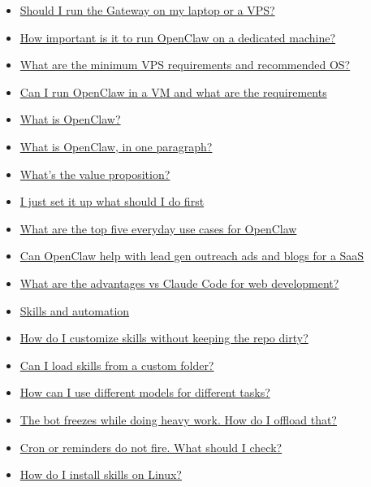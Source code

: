 \begin{itemize}
  \item \href{\#should-i-run-the-gateway-on-my-laptop-or-a-vps}{Should I run the Gateway on my laptop or a VPS?}
  \item \href{\#how-important-is-it-to-run-openclaw-on-a-dedicated-machine}{How important is it to run OpenClaw on a dedicated machine?}
  \item \href{\#what-are-the-minimum-vps-requirements-and-recommended-os}{What are the minimum VPS requirements and recommended OS?}
  \item \href{\#can-i-run-openclaw-in-a-vm-and-what-are-the-requirements}{Can I run OpenClaw in a VM and what are the requirements}
  \item \href{\#what-is-openclaw}{What is OpenClaw?}
  \item \href{\#what-is-openclaw-in-one-paragraph}{What is OpenClaw, in one paragraph?}
  \item \href{\#whats-the-value-proposition}{What's the value proposition?}
  \item \href{\#i-just-set-it-up-what-should-i-do-first}{I just set it up what should I do first}
  \item \href{\#what-are-the-top-five-everyday-use-cases-for-openclaw}{What are the top five everyday use cases for OpenClaw}
  \item \href{\#can-openclaw-help-with-lead-gen-outreach-ads-and-blogs-for-a-saas}{Can OpenClaw help with lead gen outreach ads and blogs for a SaaS}
  \item \href{\#what-are-the-advantages-vs-claude-code-for-web-development}{What are the advantages vs Claude Code for web development?}
  \item \href{\#skills-and-automation}{Skills and automation}
  \item \href{\#how-do-i-customize-skills-without-keeping-the-repo-dirty}{How do I customize skills without keeping the repo dirty?}
  \item \href{\#can-i-load-skills-from-a-custom-folder}{Can I load skills from a custom folder?}
  \item \href{\#how-can-i-use-different-models-for-different-tasks}{How can I use different models for different tasks?}
  \item \href{\#the-bot-freezes-while-doing-heavy-work-how-do-i-offload-that}{The bot freezes while doing heavy work. How do I offload that?}
  \item \href{\#cron-or-reminders-do-not-fire-what-should-i-check}{Cron or reminders do not fire. What should I check?}
  \item \href{\#how-do-i-install-skills-on-linux}{How do I install skills on Linux?}

\end{itemize}
